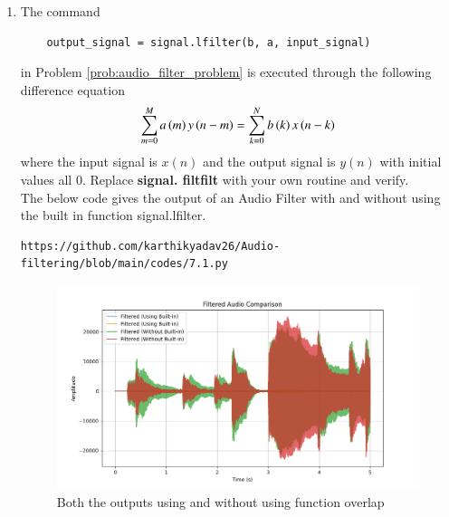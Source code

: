 \documentclass[journal,12pt,twocolumn]{IEEEtran}
\theoremstyle{remark}
\renewcommand\thesection{\arabic{section}}
\begin{document}
\begin{enumerate}[label=\thesection.\arabic*]
\item
The command
\begin{lstlisting}
	output_signal = signal.lfilter(b, a, input_signal)
	\end{lstlisting}
in Problem \ref{prob:audio_filter_problem} is executed through the following difference equation
\begin{equation}
\label{eq:iir_filter_gen}
 \sum _{m=0}^{M}a\left(m\right)y\left(n-m\right)=\sum _{k=0}^{N}b\left(k\right)x\left(n-k\right) 
\end{equation}
%
where the input signal is $x(n)$ and the output signal is $y(n)$ with initial values all 0. Replace
\textbf{signal. filtfilt} with your own routine and verify.\\

\solution The below code gives the output of an Audio Filter with and without using the built in function signal.lfilter.
\begin{lstlisting}
https://github.com/karthikyadav26/Audio-filtering/blob/main/codes/7.1.py
\end{lstlisting}
\begin{figure}[htbp]
\centering
\includegraphics[width=\columnwidth]{figs/compare.png}
\caption{Both the outputs using and without using function overlap}
\label{fig:6.1}
\end{figure}


\end{enumerate}
\end{document}
